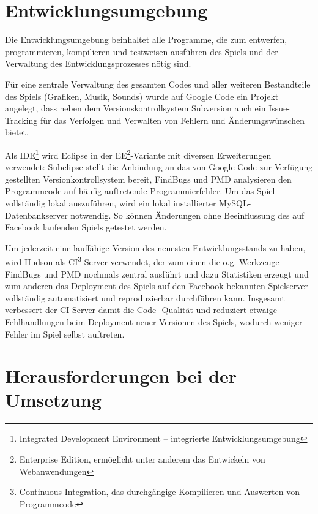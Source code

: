 \documentclass[a4paper,12pt]{scrartcl}
\begin{document}
\section{Entwicklungsumgebung}
Die Entwicklungsumgebung beinhaltet alle Programme, die zum entwerfen,
programmieren, kompilieren und testweisen ausführen des Spiels und der Verwaltung des
Entwicklungsprozesses nötig sind.

Für eine zentrale Verwaltung des gesamten Codes und aller weiteren Bestandteile des
Spiels (Grafiken, Musik, Sounds) wurde auf Google Code ein Projekt angelegt, dass neben
dem Versionskontrollsystem Subversion auch ein Issue-Tracking für das Verfolgen und
Verwalten von Fehlern und Änderungswünschen bietet.

Als IDE\footnote{Integrated Development Environment -- integrierte
Entwicklungsumgebung} wird Eclipse in der EE\footnote{Enterprise
Edition, ermöglicht unter anderem das Entwickeln von Webanwendungen}-Variante
mit diversen Erweiterungen verwendet: Subclipse stellt die Anbindung an das von Google Code zur Verfügung gestellten Versionkontrollsystem bereit, FindBugs und PMD analysieren den Programmcode auf häufig auftretende Programmierfehler.
Um das Spiel vollständig lokal auszuführen, wird ein lokal installierter MySQL-
Datenbankserver notwendig. So können Änderungen ohne Beeinflussung des auf Facebook
laufenden Spiels getestet werden.

Um jederzeit eine lauffähige Version des neuesten Entwicklungsstands zu haben, wird
Hudson als CI\footnote{Continuous Integration, das durchgängige Kompilieren und Auswerten von Programmcode}-Server verwendet, der zum einen die o.g. Werkzeuge FindBugs
und PMD nochmals zentral ausführt und dazu Statistiken erzeugt und zum anderen das
Deployment des Spiels auf den Facebook bekannten Spielserver vollständig automatisiert
und reproduzierbar durchführen kann. Insgesamt verbessert der CI-Server damit die Code-
Qualität und reduziert etwaige Fehlhandlungen beim Deployment neuer Versionen des
Spiels, wodurch weniger Fehler im Spiel selbst auftreten.

\section{Herausforderungen bei der Umsetzung}
\end{document}
